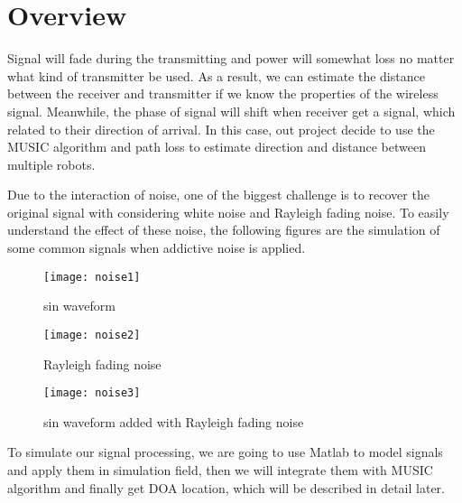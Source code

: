 
\section{Overview}
\label{sec:overview}
	Signal will fade during the transmitting and power will somewhat loss no matter what kind of transmitter be used. As a result, we can estimate the distance between the receiver and transmitter if we know the properties of the wireless signal. Meanwhile, the phase of signal will shift when receiver get a signal, which related to their direction of arrival. In this case, out project decide to use the MUSIC algorithm and path loss to estimate direction and distance between multiple robots.\\
	\par
	Due to the interaction of noise, one of the biggest challenge is to recover the original signal with considering white noise and Rayleigh fading noise. To easily understand the effect of these noise, the following figures are the simulation of some common signals when addictive noise is applied.\\
	\begin{figure}[h]
	
	\begin{minipage}[t]{0.3\linewidth}
	\centering
	\texttt{[image: noise1]}
	\caption{sin waveform}
	\end{minipage}
	
	\begin{minipage}[t]{0.3\linewidth}
	\centering
	\texttt{[image: noise2]}
	\caption{Rayleigh fading noise}
	\end{minipage}

	\begin{minipage}[t]{0.3\linewidth}
	\centering
	\texttt{[image: noise3]}
	\caption{sin waveform added with Rayleigh fading noise}
	\end{minipage}

	\end{figure}
	
	\par
	To simulate our signal processing, we are going to use Matlab to model signals and apply them in simulation field, then we will integrate them with MUSIC algorithm and finally get DOA location, which will be described in detail later. 


